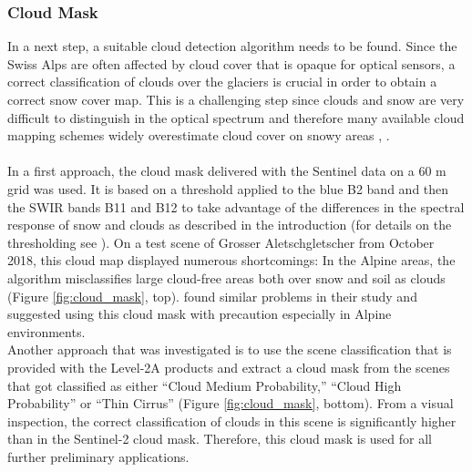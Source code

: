 \documentclass[12pt]{article}
\begin{document}
\subsubsection{Cloud Mask}
In a next step, a suitable cloud detection algorithm needs to be found. Since the Swiss Alps are often affected by cloud cover that is opaque for optical sensors, a correct classification of clouds over the glaciers is crucial in order to obtain a correct snow cover map. This is a challenging step since clouds and snow are very difficult to distinguish in the optical spectrum and therefore many available cloud mapping schemes widely overestimate cloud cover on snowy areas \cite{Koenig2001}, \cite{Coluzzi2018}. \\
\\
In a first approach, the cloud mask delivered with the Sentinel data on a 60 m grid was used. It is based on a threshold applied to the blue B2 band and then the SWIR bands B11 and B12 to take advantage of the differences in the spectral response of snow and clouds as described in the introduction (for details on the thresholding see \cite{SentinelHandbook2015}). On a test scene of Grosser Aletschgletscher from October 2018, this cloud map displayed numerous shortcomings: In the Alpine areas, the algorithm misclassifies large cloud-free areas both over snow and soil as clouds (Figure \ref{fig:cloud_mask}, top). \cite{Coluzzi2018} found similar problems in their study and suggested using this cloud mask with precaution especially in Alpine environments.\\
Another approach that was investigated is to use the scene classification that is provided with the Level-2A products and extract a cloud mask from the scenes that got classified as either “Cloud Medium Probability,” “Cloud High Probability” or “Thin Cirrus” (Figure \ref{fig:cloud_mask}, bottom).  From a visual inspection, the correct classification of clouds in this scene is significantly higher than in the Sentinel-2 cloud mask. Therefore, this cloud mask is used for all further preliminary applications.
\end{document}
